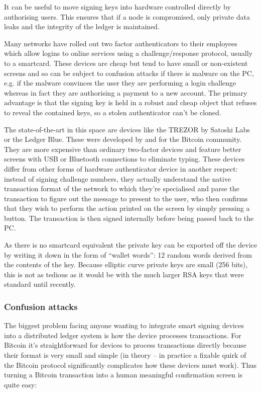 \documentclass{article}
\begin{document}
It can be useful to move signing keys into hardware controlled directly by authorising users. This ensures that
if a node is compromised, only private data leaks and the integrity of the ledger is maintained.

Many networks have rolled out two factor authenticators to their employees which allow logins to online services
using a challenge/response protocol, usually to a smartcard. These devices are cheap but tend to have small or
non-existent screens and so can be subject to confusion attacks if there is malware on the PC, e.g. if the malware
convinces the user they are performing a login challenge whereas in fact they are authorising a payment to a new
account. The primary advantage is that the signing key is held in a robust and cheap object that refuses to reveal
the contained keys, so a stolen authenticator can't be cloned.

The state-of-the-art in this space are devices like the TREZOR\cite{TREZOR} by Satoshi Labs or the Ledger Blue.
These were developed by and for the Bitcoin community. They are more expensive than ordinary two-factor devices and feature better
screens with USB or Bluetooth connections to eliminate typing. These devices differ from other forms of hardware
authenticator device in another respect: instead of signing challenge numbers, they actually understand the native
transaction format of the network to which they're specialised and parse the transaction to figure out the message
to present to the user, who then confirms that they wish to perform the action printed on the screen by simply
pressing a button. The transaction is then signed internally before being passed back to the PC.

As there is no smartcard equivalent the private key can be exported off the device by writing it down in the form
of ``wallet words'': 12 random words derived from the contents of the key. Because elliptic curve private keys
are small (256 bits), this is not as tedious as it would be with the much larger RSA keys that were standard until
recently.

\subsubsection{Confusion attacks}

The biggest problem facing anyone wanting to integrate smart signing devices into a distributed ledger system is
how the device processes transactions. For Bitcoin it's straightforward for devices to process transactions
directly because their format is very small and simple (in theory -- in practice a fixable quirk of the Bitcoin
protocol significantly complicates how these devices must work). Thus turning a Bitcoin transaction into a
human meaningful confirmation screen is quite easy:
\end{document}
